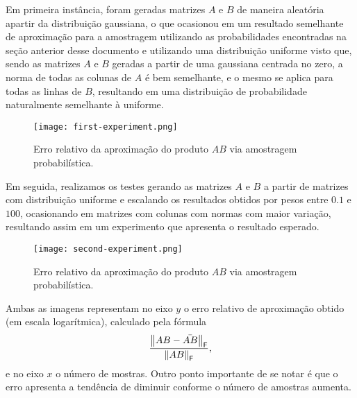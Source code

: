 
Em primeira instância, foram geradas matrizes $A$ e $B$ de maneira aleatória apartir da distribuição gaussiana, o que ocasionou em um resultado semelhante de aproximação para a amostragem utilizando as probabilidades encontradas na seção anterior desse documento e utilizando uma distribuição uniforme visto que, sendo as matrizes $A$ e $B$ geradas a partir de uma gaussiana centrada no zero, a norma de todas as colunas de $A$ é bem semelhante, e o mesmo se aplica para todas as linhas de $B$, resultando em uma distribuição de probabilidade naturalmente semelhante à uniforme.

\begin{figure}[H]
  \centering
  \texttt{[image: first-experiment.png]}
  \caption{Erro relativo da aproximação do produto $AB$ via amostragem probabilística.}
  \label{fig:first-experiment}
\end{figure}

Em seguida, realizamos os testes gerando as matrizes $A$ e $B$ a partir de matrizes com distribuição uniforme e escalando os resultados obtidos por pesos entre $0.1$ e $100$, ocasionando em matrizes com colunas com normas com maior variação, resultando assim em um experimento que apresenta o resultado esperado.

\begin{figure}[H]
  \centering
  \texttt{[image: second-experiment.png]}
  \caption{Erro relativo da aproximação do produto $AB$ via amostragem probabilística.}
  \label{fig:second-experiment}
\end{figure}

Ambas as imagens representam no eixo $y$ o erro relativo de aproximação obtido (em escala logarítmica), calculado pela fórmula \[\dfrac{\left\lVert AB - \bar{AB}\right\rVert_\mathsf{F}}{\left\lVert AB\right\rVert_\mathsf{F}},\] e no eixo $x$ o número de mostras. Outro ponto importante de se notar é que o erro apresenta a tendência de diminuir conforme o número de amostras aumenta.
